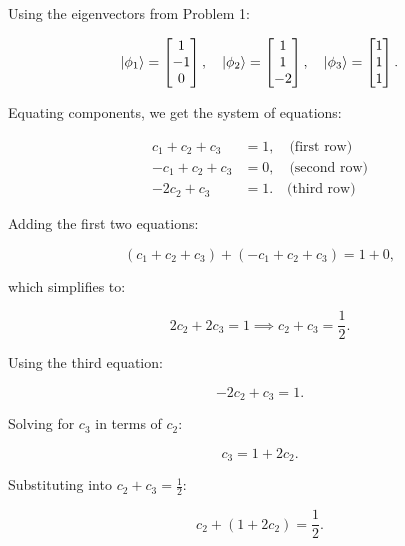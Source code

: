 \documentclass[12pt]{article}
\begin{document}
Using the eigenvectors from Problem 1:

\begin{equation}
    \ket{\phi_1} = \begin{bmatrix} 1 \\ -1 \\ 0 \end{bmatrix}, \quad
    \ket{\phi_2} = \begin{bmatrix} 1 \\ 1 \\ -2 \end{bmatrix}, \quad
    \ket{\phi_3} = \begin{bmatrix} 1 \\ 1 \\ 1 \end{bmatrix}.
\end{equation}

Equating components, we get the system of equations:

\begin{align}
    c_1 + c_2 + c_3 &= 1, \quad \text{(first row)} \\
    -c_1 + c_2 + c_3 &= 0, \quad \text{(second row)} \\
    -2c_2 + c_3 &= 1. \quad \text{(third row)}
\end{align}

Adding the first two equations:

\begin{equation}
    (c_1 + c_2 + c_3) + (-c_1 + c_2 + c_3) = 1 + 0,
\end{equation}

which simplifies to:

\begin{equation}
    2c_2 + 2c_3 = 1 \implies c_2 + c_3 = \frac{1}{2}.
\end{equation}

Using the third equation:

\begin{equation}
    -2c_2 + c_3 = 1.
\end{equation}

Solving for $c_3$ in terms of $c_2$:

\begin{equation}
    c_3 = 1 + 2c_2.
\end{equation}

Substituting into $c_2 + c_3 = \frac{1}{2}$:

\begin{equation}
    c_2 + (1 + 2c_2) = \frac{1}{2}.
\end{equation}
\end{document}
